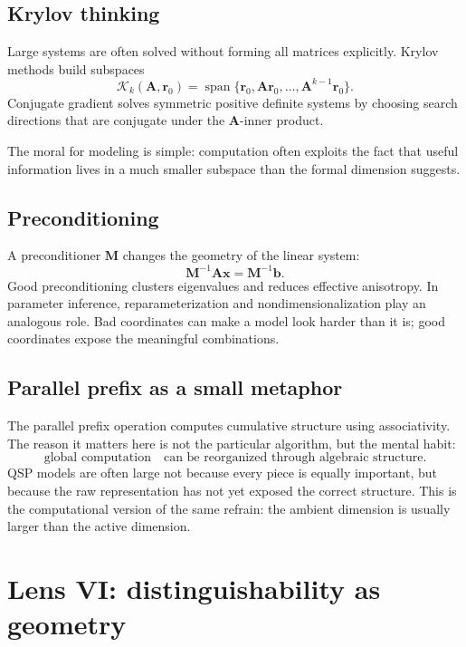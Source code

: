 \documentclass[a4paper]{article}
\DeclareMathOperator{\spanop}{span}
\newcommand{\mat}[1]{\mathbf{#1}}
\newcommand{\vect}[1]{\mathbf{#1}}
\begin{document}
\subsection{Krylov thinking}

Large systems are often solved without forming all matrices explicitly.  Krylov methods build subspaces
\[
  \mathcal{K}_k(\mat{A},\vect{r}_0)
  =
  \spanop\{\vect{r}_0,\mat{A}\vect{r}_0,\ldots,\mat{A}^{k-1}\vect{r}_0\}.
\]
Conjugate gradient solves symmetric positive definite systems by choosing search directions that are conjugate under the \(\mat{A}\)-inner product.

The moral for modeling is simple: computation often exploits the fact that useful information lives in a much smaller subspace than the formal dimension suggests.

\subsection{Preconditioning}

A preconditioner \(\mat{M}\) changes the geometry of the linear system:
\[
  \mat{M}^{-1}\mat{A}\vect{x}=\mat{M}^{-1}\vect{b}.
\]
Good preconditioning clusters eigenvalues and reduces effective anisotropy.  In parameter inference, reparameterization and nondimensionalization play an analogous role.  Bad coordinates can make a model look harder than it is; good coordinates expose the meaningful combinations.

\subsection{Parallel prefix as a small metaphor}

The parallel prefix operation computes cumulative structure using associativity.  The reason it matters here is not the particular algorithm, but the mental habit:
\[
  \text{global computation}
  \quad\text{can be reorganized through algebraic structure.}
\]
QSP models are often large not because every piece is equally important, but because the raw representation has not yet exposed the correct structure.  This is the computational version of the same refrain: the ambient dimension is usually larger than the active dimension.

\section{Lens VI: distinguishability as geometry}
\end{document}

